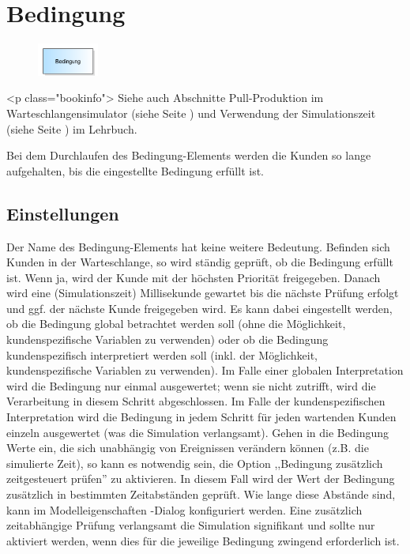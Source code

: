 \section{Bedingung}
\label{ref:ModelElementHold}

\begin{figure}
\vspace{-22pt}
\includegraphics[width=2cm]{imageModelElementHold.png}
\vspace{-22pt}
\end{figure}

<p class="bookinfo">
Siehe auch Abschnitte Pull-Produktion im Warteschlangensimulator (siehe Seite \pageref{ref:book:7.6.3}) 
und Verwendung der Simulationszeit (siehe Seite \pageref{ref:book:8.8.3}) im Lehrbuch.

Bei dem Durchlaufen des Bedingung-Elements werden die Kunden so lange aufgehalten, bis die eingestellte Bedingung erfüllt ist. 

\subsection*{Einstellungen}

Der Name des Bedingung-Elements hat keine weitere Bedeutung. Befinden sich Kunden in der Warteschlange, so wird ständig geprüft,
ob die Bedingung erfüllt ist. Wenn ja, wird der Kunde mit der höchsten Priorität freigegeben. Danach wird eine (Simulationszeit) Millisekunde
gewartet bis die nächste Prüfung erfolgt und ggf. der nächste Kunde freigegeben wird. Es kann dabei eingestellt werden, ob die Bedingung global
betrachtet werden soll (ohne die Möglichkeit, kundenspezifische Variablen zu verwenden) oder ob die Bedingung kundenspezifisch interpretiert
werden soll (inkl. der Möglichkeit, kundenspezifische Variablen zu verwenden). Im Falle einer globalen Interpretation wird die Bedingung nur
einmal ausgewertet; wenn sie nicht zutrifft, wird die Verarbeitung in diesem Schritt abgeschlossen. Im Falle der kundenspezifischen Interpretation
wird die Bedingung in jedem Schritt für jeden wartenden Kunden einzeln ausgewertet (was die Simulation verlangsamt).
Gehen in die Bedingung Werte ein, die sich unabhängig von Ereignissen verändern können (z.B. die simulierte Zeit), so kann es notwendig sein,
die Option ,,Bedingung zusätzlich zeitgesteuert prüfen'' zu aktivieren. In diesem Fall wird der Wert der Bedingung zusätzlich in bestimmten
Zeitabständen geprüft. Wie lange diese Abstände sind, kann im Modelleigenschaften -Dialog konfiguriert
werden. Eine zusätzlich zeitabhängige Prüfung verlangsamt die Simulation signifikant und sollte nur aktiviert werden, wenn dies für die
jeweilige Bedingung zwingend erforderlich ist. 


